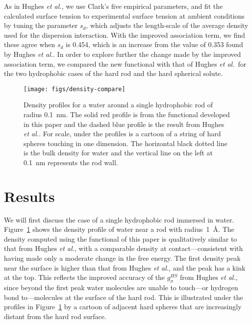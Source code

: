 \documentclass[preprint, endfloats,amsmath,amssymb,jcp]{revtex4-1}
\newcommand\lscale{\ensuremath{s_d}}
\newcommand\hughesetal{Hughes \emph{et al.}}
\begin{document}
As in \hughesetal, we use Clark's five empirical parameters, and fit
the calculated surface tension to experimental surface tension at
ambient conditions by tuning the parameter $\lscale$, which adjusts
the length-scale of the average density used for the dispersion
interaction.  With the improved association term, we find these agree
when $\lscale$ is 0.454, which is an increase from the value of 0.353
found by \hughesetal.  In order to explore further the change made by
the improved association term, we compared the new functional with
that of \hughesetal\ for the two hydrophobic cases of the hard rod and
the hard spherical solute.

\begin{figure}
\begin{center}
\texttt{[image: figs/density-compare]}
\end{center}
\caption{ Density profiles for a water around a single hydrophobic rod
  of radius 0.1~nm. The solid red profile is from the functional
  developed in this paper and the dashed blue profile is the result
  from \hughesetal.  For scale, under the profiles
  is a cartoon of a string of hard spheres touching in one
  dimension. The horizontal black dotted line is the bulk density for
  water and the vertical line on the left at 0.1~nm represents the
  rod wall.}
\label{fig:density-single-rod}
\end{figure}

\section{Results}

We will first discuss the case of a single hydrophobic rod immersed in
water. Figure~\ref{fig:density-single-rod} shows the density profile
of water near a rod with radius~1~\AA.  The density computed using the
functional of this paper is qualitatively similar to that from
\hughesetal, with a comparable density at contact---consistent with
having made only a moderate change in the free energy.  The first
density peak near the surface is higher than that from \hughesetal,
and the peak has a kink at the top.  This reflects the improved
accuracy of the $g_\sigma^\textit{HS}$ from \hughesetal, since beyond
the first peak water molecules are unable to touch---or hydrogen bond
to---molecules at the surface of the hard rod. This is illustrated
under the profiles in Figure~\ref{fig:density-single-rod} by a cartoon
of adjacent hard spheres that are increasingly distant from the hard
rod surface.
\end{document}
